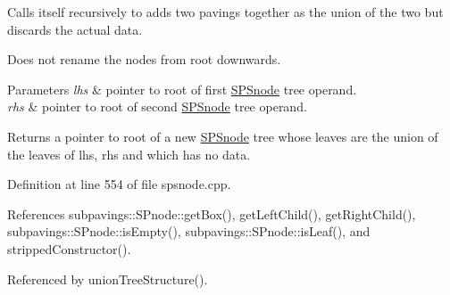 \-Calls itself recursively to adds two pavings together as the union of the two but discards the actual data.

\-Does not rename the nodes from root downwards.


\begin{DoxyParams}{\-Parameters}
{\em lhs} & pointer to root of first \hyperlink{classsubpavings_1_1SPSnode}{\-S\-P\-Snode} tree operand. \\
\hline
{\em rhs} & pointer to root of second \hyperlink{classsubpavings_1_1SPSnode}{\-S\-P\-Snode} tree operand. \\
\hline
\end{DoxyParams}
\begin{DoxyReturn}{\-Returns}
a pointer to root of a new \hyperlink{classsubpavings_1_1SPSnode}{\-S\-P\-Snode} tree whose leaves are the union of the leaves of lhs, rhs and which has no data. 
\end{DoxyReturn}


\-Definition at line 554 of file spsnode.\-cpp.



\-References subpavings\-::\-S\-Pnode\-::get\-Box(), get\-Left\-Child(), get\-Right\-Child(), subpavings\-::\-S\-Pnode\-::is\-Empty(), subpavings\-::\-S\-Pnode\-::is\-Leaf(), and stripped\-Constructor().



\-Referenced by union\-Tree\-Structure().


